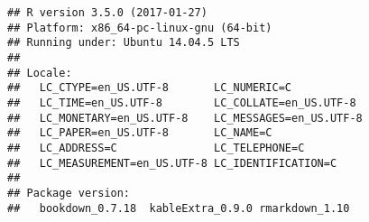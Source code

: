 \documentclass[]{book}
\begin{document}
\begin{verbatim}
## R version 3.5.0 (2017-01-27)
## Platform: x86_64-pc-linux-gnu (64-bit)
## Running under: Ubuntu 14.04.5 LTS
## 
## Locale:
##   LC_CTYPE=en_US.UTF-8       LC_NUMERIC=C              
##   LC_TIME=en_US.UTF-8        LC_COLLATE=en_US.UTF-8    
##   LC_MONETARY=en_US.UTF-8    LC_MESSAGES=en_US.UTF-8   
##   LC_PAPER=en_US.UTF-8       LC_NAME=C                 
##   LC_ADDRESS=C               LC_TELEPHONE=C            
##   LC_MEASUREMENT=en_US.UTF-8 LC_IDENTIFICATION=C       
## 
## Package version:
##   bookdown_0.7.18  kableExtra_0.9.0 rmarkdown_1.10
\end{verbatim}


\end{document}

